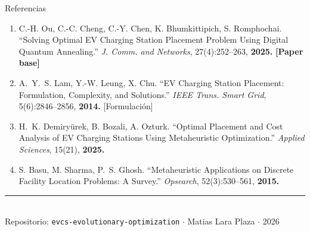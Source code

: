 \documentclass[aspectratio=169, 12pt]{beamer}
\newcommand{\acento}[1]{\textcolor{Verde}{\textbf{#1}}}
\newcommand{\acentob}[1]{\textcolor{Cian}{#1}}
\newcommand{\gris}[1]{\textcolor{GrisAzul}{#1}}
\begin{document}
\begin{frame}{Referencias}
  \begin{enumerate}\small
    \item \textcolor{BlancoCool}{C.-H. Ou, C.-C. Cheng, C.-Y. Chen, K. Bhumkittipich, S. Romphochai.}
      \gris{``Solving Optimal EV Charging Station Placement Problem Using Digital Quantum Annealing.''}
      \textit{J. Comm. and Networks}, 27(4):252--263, \textbf{2025.}
      \hfill\acento{[Paper base]}

    \vspace{0.3em}
    \item \textcolor{BlancoCool}{A.~Y.~S. Lam, Y.-W. Leung, X. Chu.}
      \gris{``EV Charging Station Placement: Formulation, Complexity, and Solutions.''}
      \textit{IEEE Trans. Smart Grid}, 5(6):2846--2856, \textbf{2014.}
      \hfill\acentob{[Formulación]}

    \vspace{0.3em}
    \item \textcolor{BlancoCool}{H.~K. Demiryürek, B. Bozali, A. Ozturk.}
      \gris{``Optimal Placement and Cost Analysis of EV Charging Stations Using Metaheuristic Optimization.''}
      \textit{Applied Sciences}, 15(21), \textbf{2025.}

    \vspace{0.3em}
    \item \textcolor{BlancoCool}{S. Basu, M. Sharma, P.~S. Ghosh.}
      \gris{``Metaheuristic Applications on Discrete Facility Location Problems: A Survey.''}
      \textit{Opsearch}, 52(3):530--561, \textbf{2015.}
  \end{enumerate}

  \vspace{0.4em}
  \begin{center}
    \textcolor{Cian}{\rule{0.75\textwidth}{0.4pt}}\\[0.3em]
    \gris{\small Repositorio: \texttt{evcs-evolutionary-optimization} $\cdot$ Matias Lara Plaza $\cdot$ 2026}
  \end{center}
\end{frame}

\maketitle
\end{document}
